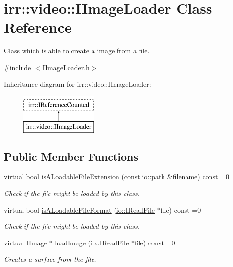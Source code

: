 \hypertarget{classirr_1_1video_1_1IImageLoader}{}\section{irr\+:\+:video\+:\+:I\+Image\+Loader Class Reference}
\label{classirr_1_1video_1_1IImageLoader}


Class which is able to create a image from a file.  




{\ttfamily \#include $<$I\+Image\+Loader.\+h$>$}

Inheritance diagram for irr\+:\+:video\+:\+:I\+Image\+Loader\+:\begin{figure}[H]
\begin{center}
\leavevmode
\includegraphics[height=2.000000cm]{classirr_1_1video_1_1IImageLoader}
\end{center}
\end{figure}
\subsection*{Public Member Functions}
\begin{DoxyCompactItemize}
\item 
virtual bool \hyperlink{classirr_1_1video_1_1IImageLoader_a74f191446424017b8a71fea274bd0f0a}{is\+A\+Loadable\+File\+Extension} (const \hyperlink{namespaceirr_1_1io_ab1bdc45edb3f94d8319c02bc0f840ee1}{io\+::path} \&filename) const =0
\begin{DoxyCompactList}\small\item\em Check if the file might be loaded by this class. \end{DoxyCompactList}\item 
virtual bool \hyperlink{classirr_1_1video_1_1IImageLoader_aeb87ae825dfdb747e826b1e001a5f5cc}{is\+A\+Loadable\+File\+Format} (\hyperlink{classirr_1_1io_1_1IReadFile}{io\+::\+I\+Read\+File} $\ast$file) const =0
\begin{DoxyCompactList}\small\item\em Check if the file might be loaded by this class. \end{DoxyCompactList}\item 
virtual \hyperlink{classirr_1_1video_1_1IImage}{I\+Image} $\ast$ \hyperlink{classirr_1_1video_1_1IImageLoader_ac3cafd8396e2f6e762f91604bcacf5d3}{load\+Image} (\hyperlink{classirr_1_1io_1_1IReadFile}{io\+::\+I\+Read\+File} $\ast$file) const =0
\begin{DoxyCompactList}\small\item\em Creates a surface from the file. \end{DoxyCompactList}\end{DoxyCompactItemize}
